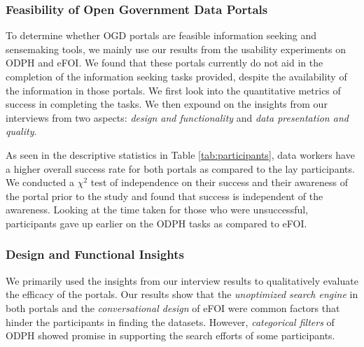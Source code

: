 \documentclass{sigchi}
\begin{document}
\subsubsection{Feasibility of Open Government Data Portals}
To determine whether OGD portals are feasible information seeking and sensemaking tools, we mainly use our results from the usability experiments on ODPH and eFOI. We found that these portals currently do not aid in the completion of the information seeking tasks provided, despite the availability of the information in those portals. We first look into the quantitative metrics of success in completing the tasks. We then expound on the insights from our interviews from two aspects: \textit{design and functionality} and \textit{data presentation and quality}.

As seen in the descriptive statistics in Table \ref{tab:participants}, data workers have a higher overall success rate for both portals as compared to the lay participants. We conducted a $\chi^2$ test of independence on their success and their awareness of the portal prior to the study and found that success is independent of the awareness. Looking at the time taken for those who were unsuccessful, participants gave up earlier on the ODPH tasks as compared to eFOI. 



\subsubsection{Design and Functional Insights}
We primarily used the insights from our interview results to qualitatively evaluate the efficacy of the portals. Our results show that the \textit{unoptimized search engine} in both portals and the \textit{conversational design} of eFOI were common factors that hinder the participants in finding the datasets. However, \textit{categorical filters} of ODPH showed promise in supporting the search efforts of some participants. 
\end{document}
